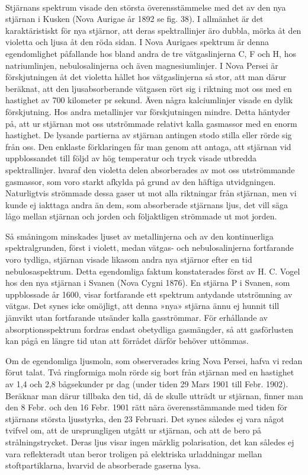 \documentclass[a4paper, 12pt, oneside, swedish]{article}
\begin{document}
\paragraph{}
Stjärnans spektrum visade den största överensstämmelse med det av den nya stjärnan i Kusken (Nova Aurigae år 1892 se fig. 38). I allmänhet är det karaktäristiskt för nya stjärnor, att deras spektrallinjer äro dubbla, mörka åt den violetta och ljusa åt den röda sidan. I Nova Aurigaes spektrum är denna egendomlighet påfallande hos bland andra de tre vätgaslinjerna C, F och H, hos natriumlinjen, nebulosalinjerna och även magnesiumlinjer. I Nova Persei är förskjutningen åt det violetta hållet hos vätgaslinjerna så stor, att man därur beräknat, att den ljusabsorberande vätgasen rört sig i riktning mot oss med en hastighet av 700 kilometer pr sekund. Även några kalciumlinjer visade en dylik förskjutning. Hos andra metallinjer var förskjutningen mindre. Detta häntyder på, att ur stjärnan mot oss utströmmade relativt kalla gasmassor med en enorm hastighet. De lysande partierna av stjärnan antingen stodo stilla eller rörde sig från oss. Den enklaste förklaringen får man genom att antaga, att stjärnan vid uppblossandet till följd av hög temperatur och tryck visade utbredda spektrallinjer. hvaraf den violetta delen absorberades av mot oss utströmmande gasmassor, som voro starkt afkylda på grund av den häftiga utvidgningen. Naturligtvis strömmade dessa gaser ut mot alla riktningar från stjärnan, men vi kunde ej iakttaga andra än dem, som absorberade stjärnans ljus, det vill säga lågo mellan stjärnan och jorden och följaktligen strömmade ut mot jorden.

Så småningom minskades ljuset av metallinjerna och av den kontinuerliga spektralgrunden, först i violett, medan vätgas- och nebulosalinjerna fortfarande voro tydliga, stjärnan visade likasom andra nya stjärnor efter en tid nebulosaspektrum. Detta egendomliga faktum konstaterades först av H. C. Vogel hos den nya stjärnan i Svanen (Nova Cygni 1876). En stjärna P i Svanen, som uppblossade år 1600, visar fortfarande ett spektrum antydande utströmning av vätgas. Det synes icke omöjligt, att denna »nya» stjärna ännu ej hunnit till jämvikt utan fortfarande utsänder kalla gasströmmar. För erhållande av absorptionsspektrum fordras endast obetydliga gasmängder, så att gasförlusten kan pågå en längre tid utan att förrådet därför behöver uttömmas.

Om de egendomliga ljusmoln, som observerades kring Nova Persei, hafva vi redan förut talat. Två ringformiga moln rörde sig bort från stjärnan med en hastighet av 1,4 och 2,8 bågsekunder pr dag (under tiden 29 Mars 1901 till Febr. 1902). Beräknar man därur tillbaka den tid, då de skulle utträdt ur stjärnan, finner man den 8 Febr. och den 16 Febr. 1901 rätt nära överensstämmande med tiden för stjärnans största ljusstyrka, den 23 Februari. Det synes således ej vara något tvifvel om, att de ursprungligen utgått ur stjärnan, och att de bero på strålningstrycket. Deras ljus visar ingen märklig polarisation, det kan således ej vara reflekteradt utan beror troligen på elektriska urladdningar mellan stoftpartiklarna, hvarvid de absorberade gaserna lysa.
\end{document}
